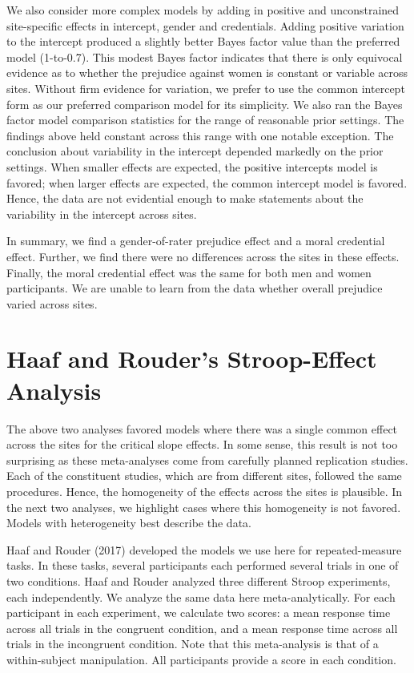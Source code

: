 \documentclass[english,man]{apa6}
\theoremstyle{definition}
\theoremstyle{definition}
\theoremstyle{definition}
\theoremstyle{remark}
\begin{document}
We also consider more complex models by adding in positive and
unconstrained site-specific effects in intercept, gender and
credentials. Adding positive variation to the intercept produced a
slightly better Bayes factor value than the preferred model (1-to-0.7).
This modest Bayes factor indicates that there is only equivocal evidence
as to whether the prejudice against women is constant or variable across
sites. Without firm evidence for variation, we prefer to use the common
intercept form as our preferred comparison model for its simplicity. We
also ran the Bayes factor model comparison statistics for the range of
reasonable prior settings. The findings above held constant across this
range with one notable exception. The conclusion about variability in
the intercept depended markedly on the prior settings. When smaller
effects are expected, the positive intercepts model is favored; when
larger effects are expected, the common intercept model is favored.
Hence, the data are not evidential enough to make statements about the
variability in the intercept across sites.

In summary, we find a gender-of-rater prejudice effect and a moral
credential effect. Further, we find there were no differences across the
sites in these effects. Finally, the moral credential effect was the
same for both men and women participants. We are unable to learn from
the data whether overall prejudice varied across sites.

\section{Haaf and Rouder's Stroop-Effect
Analysis}\label{haaf-and-rouders-stroop-effect-analysis}

The above two analyses favored models where there was a single common
effect across the sites for the critical slope effects. In some sense,
this result is not too surprising as these meta-analyses come from
carefully planned replication studies. Each of the constituent studies,
which are from different sites, followed the same procedures. Hence, the
homogeneity of the effects across the sites is plausible. In the next
two analyses, we highlight cases where this homogeneity is not favored.
Models with heterogeneity best describe the data.

Haaf and Rouder (2017) developed the models we use here for
repeated-measure tasks. In these tasks, several participants each
performed several trials in one of two conditions. Haaf and Rouder
analyzed three different Stroop experiments, each independently. We
analyze the same data here meta-analytically. For each participant in
each experiment, we calculate two scores: a mean response time across
all trials in the congruent condition, and a mean response time across
all trials in the incongruent condition. Note that this meta-analysis is
that of a within-subject manipulation. All participants provide a score
in each condition.
\end{document}
